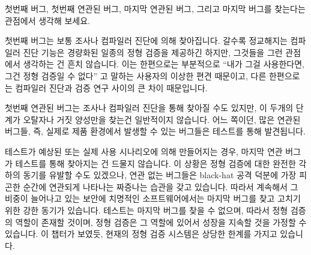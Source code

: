 첫번째 버그, 첫번째 연관된 버그, 마지막 연관된 버그, 그리고 마지막 버그를
찾는다는 관점에서 생각해 보세요.

\iffalse

The formal-verification techniques described in this chapter
are very powerful tools for validating small
parallel algorithms, but they should not be the only tools in your toolbox.
Despite decades of focus on formal verification, testing remains the
validation workhorse for large parallel software
systems~\cite{JonathanCorbet2006lockdep,DaveJones2011Trinity,PaulEMcKenney2016Formal}.

It is nevertheless quite possible that this will not always be the case.
To see this, consider that there is estimated to be more than twenty
billion instances of the Linux kernel as of 2017.
Suppose that the Linux kernel has a bug that manifests on average every million
years of runtime.
As noted at the end of the preceding chapter, this bug will be appearing
more than 50 times \emph{per day} across the installed base.
But the fact remains that most formal validation techniques can be used
only on very small codebases.
So what is a concurrency coder to do?

Think in terms of finding the first bug, the first relevant bug, the
last relevant bug, and the last bug.

\fi

첫번째 버그는 보통 조사나 컴파일러 진단에 의해 찾아집니다.
갈수록 정교해지는 컴파일러 진단 기능은 경량화된 일종의 정형 검증을 제공하긴
하지만, 그것들을 그런 관점에서 생각하는 건 흔치 않습니다.
이는 한편으로는 부분적으로 ``내가 그걸 사용한다면, 그건 정형 검증일 수 없다''
고 말하는 사용자의 이상한 편견 때문이고, 다른 한편으로는 컴파일러 진단과 검증
연구 사이의 큰 차이 때문입니다.

첫번째 연관된 버그는 조사나 컴파일러 진단을 통해 찾아질 수도 있지만, 이 두개의
단계가 오탈자나 거짓 양성만을 찾는건 일반적이지 않습니다.
어느 쪽이던, 많은 연관된 버그들, 즉, 실제로 제품 환경에서 발생할 수 있는
버그들은 테스트를 통해 발견됩니다.

테스트가 예상된 또는 실제 사용 시나리오에 의해 만들어지는 경우, 마지막 연관
버그가 테스트를 통해 찾아지는 건 드물지 않습니다.
이 상황은 정형 검증에 대한 완전한 각하의 동기를 유발할 수도 있겠으나, 연관 없는
버그들은 black-hat 공격 덕분에 가장 피곤한 순간에 연관되게 나타나는 짜증나는
습관을 갖고 있습니다.
따라서 계속해서 그 비중이 늘어나고 있는 보안에 치명적인 소프트웨어에서는 마지막
버그를 찾고 고치기 위한 강한 동기가 있습니다.
테스트는 마지막 버그를 찾을 수 없으며, 따라서 정형 검증의 역할이 존재할 것이며,
정형 검증은 그 역할에 있어서 성장을 지속할 것을 가정할 수 있습니다.
이 챕터가 보였듯, 현재의 정형 검증 시스템은 상당한 한계를 가지고 있습니다.

